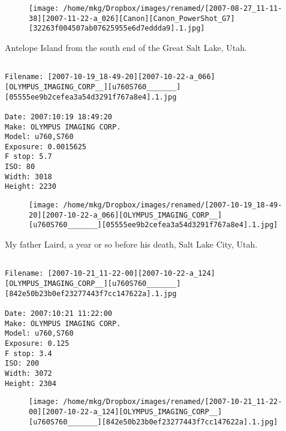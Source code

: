 \begin{figure}
\texttt{[image: /home/mkg/Dropbox/images/renamed/[2007-08-27\_11-11-38][2007-11-22-a\_026][Canon][Canon\_PowerShot\_G7][32263f004507ab07625955e6d7eddda9].1.jpg]}
\end{figure}
    
\clearpage
\onecolumn
\noindent Antelope Island from the south end of the Great Salt Lake, Utah.
\noindent
\begin{lstlisting}

Filename: [2007-10-19_18-49-20][2007-10-22-a_066][OLYMPUS_IMAGING_CORP__][u760S760_______][05555ee9b2cefea3a54d3291f767a8e4].1.jpg

Date: 2007:10:19 18:49:20
Make: OLYMPUS IMAGING CORP.  
Model: u760,S760       
Exposure: 0.0015625
F stop: 5.7
ISO: 80
Width: 3018
Height: 2230
\end{lstlisting}
\clearpage

\begin{figure}
\texttt{[image: /home/mkg/Dropbox/images/renamed/[2007-10-19\_18-49-20][2007-10-22-a\_066][OLYMPUS\_IMAGING\_CORP\_\_][u760S760\_\_\_\_\_\_\_][05555ee9b2cefea3a54d3291f767a8e4].1.jpg]}
\end{figure}
    
\clearpage
\onecolumn
\noindent My father Laird, a year or so before his death, Salt Lake City, Utah.
\noindent
\begin{lstlisting}

Filename: [2007-10-21_11-22-00][2007-10-22-a_124][OLYMPUS_IMAGING_CORP__][u760S760_______][842e50b23b0ef23277443f7cc147622a].1.jpg

Date: 2007:10:21 11:22:00
Make: OLYMPUS IMAGING CORP.  
Model: u760,S760       
Exposure: 0.125
F stop: 3.4
ISO: 200
Width: 3072
Height: 2304
\end{lstlisting}
\clearpage

\begin{figure}
\texttt{[image: /home/mkg/Dropbox/images/renamed/[2007-10-21\_11-22-00][2007-10-22-a\_124][OLYMPUS\_IMAGING\_CORP\_\_][u760S760\_\_\_\_\_\_\_][842e50b23b0ef23277443f7cc147622a].1.jpg]}
\end{figure}
    
